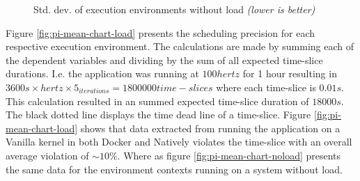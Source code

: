 \mydatanoload
\begin{figure}[H]
\caption{Std. dev. of execution environments without load \textit{(lower is better)}}
\label{fig:pi-std-chart-noload}
\end{figure}




Figure \ref{fig:pi-mean-chart-load} presents the scheduling precision for each respective execution environment. The calculations are made by summing each of the dependent variables and dividing by the sum of all expected time-slice durations. I.e. the application was running at $100hertz$ for 1 hour resulting in $3600s \times hertz \times 5_{iterations}=1 800 000 time-slices$ where each time-slice is $0.01s$. This calculation resulted in an summed expected time-slice duration of $18000s$. The black dotted line displays the time dead line of a time-slice. Figure \ref{fig:pi-mean-chart-load} shows that data extracted from running the application on a Vanilla kernel in both Docker and Natively violates the time-slice with an overall average violation of $\sim10\%$. Where as figure \ref{fig:pi-mean-chart-noload} presents the same data for the environment contexts running on a system without load.





